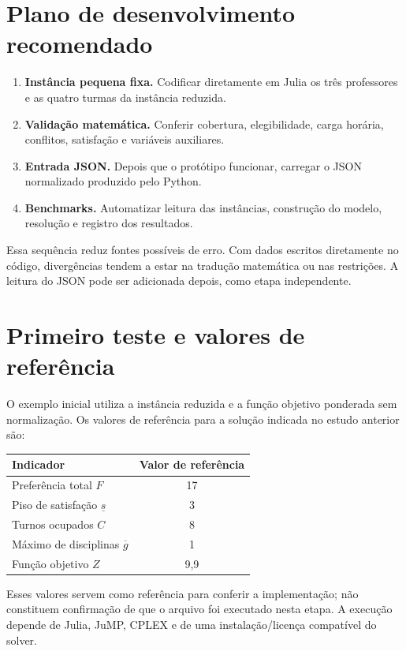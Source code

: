 \documentclass[11pt,a4paper]{article}
\begin{document}
\section{Plano de desenvolvimento recomendado}
\begin{enumerate}[label=\textbf{Etapa \Alph*.}]
\item \textbf{Instância pequena fixa.} Codificar diretamente em Julia os três professores e as quatro turmas da instância reduzida.
\item \textbf{Validação matemática.} Conferir cobertura, elegibilidade, carga horária, conflitos, satisfação e variáveis auxiliares.
\item \textbf{Entrada JSON.} Depois que o protótipo funcionar, carregar o JSON normalizado produzido pelo Python.
\item \textbf{Benchmarks.} Automatizar leitura das instâncias, construção do modelo, resolução e registro dos resultados.
\end{enumerate}
Essa sequência reduz fontes possíveis de erro. Com dados escritos diretamente no código, divergências tendem a estar na tradução matemática ou nas restrições. A leitura do JSON pode ser adicionada depois, como etapa independente.

\section{Primeiro teste e valores de referência}
O exemplo inicial utiliza a instância reduzida e a função objetivo ponderada sem normalização. Os valores de referência para a solução indicada no estudo anterior são:
\begin{center}
\begin{tabular}{lc}
\toprule
\textbf{Indicador} & \textbf{Valor de referência}\\
\midrule
Preferência total $F$ & 17\\
Piso de satisfação $\underline{s}$ & 3\\
Turnos ocupados $C$ & 8\\
Máximo de disciplinas $\overline{g}$ & 1\\
Função objetivo $Z$ & 9{,}9\\
\bottomrule
\end{tabular}
\end{center}
Esses valores servem como referência para conferir a implementação; não constituem confirmação de que o arquivo foi executado nesta etapa. A execução depende de Julia, JuMP, CPLEX e de uma instalação/licença compatível do solver.
\end{document}
